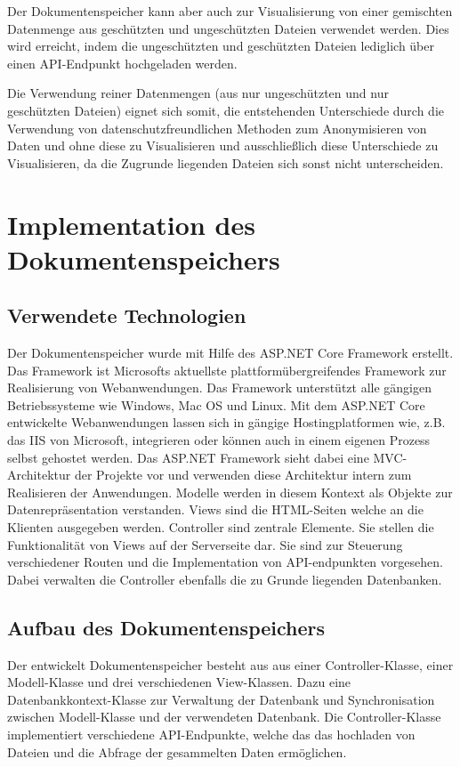 \documentclass[
    fontsize=12pt,
    headings=small,
    parskip=half,           %
    bibliography=totoc,
    numbers=noenddot,       %
    open=any,               %
    ]{scrreprt}
\begin{document}
Der Dokumentenspeicher kann aber auch zur Visualisierung von einer gemischten Datenmenge aus geschützten und ungeschützten Dateien verwendet werden. Dies wird erreicht, indem die ungeschützten und geschützten Dateien lediglich über einen API-Endpunkt hochgeladen werden.

Die Verwendung reiner Datenmengen (aus nur ungeschützten und nur geschützten Dateien) eignet sich somit, die entstehenden Unterschiede durch die Verwendung von datenschutzfreundlichen Methoden zum Anonymisieren von Daten und ohne diese zu Visualisieren und ausschließlich diese Unterschiede zu Visualisieren, da die Zugrunde liegenden Dateien sich sonst nicht unterscheiden. 

\newpage
    \section{Implementation des Dokumentenspeichers}    
    
    \subsection{Verwendete Technologien}
Der Dokumentenspeicher wurde mit Hilfe des ASP.NET Core Framework erstellt. 
Das Framework ist Microsofts aktuellste plattformübergreifendes Framework zur Realisierung von Webanwendungen.
Das Framework unterstützt alle gängigen Betriebssysteme wie Windows, Mac OS und Linux.
Mit dem ASP.NET Core entwickelte Webanwendungen lassen sich in gängige Hostingplatformen wie, z.B. das IIS von Microsoft, integrieren oder können auch in einem eigenen Prozess selbst gehostet werden. 
Das ASP.NET Framework sieht dabei eine MVC-Architektur der Projekte vor und verwenden diese Architektur intern zum Realisieren der Anwendungen. 
Modelle werden in diesem Kontext als Objekte zur Datenrepräsentation verstanden. 
Views sind die HTML-Seiten welche an die Klienten ausgegeben werden.
Controller sind zentrale Elemente. 
Sie stellen die Funktionalität von Views auf der Serverseite dar.
Sie sind zur Steuerung verschiedener Routen und die Implementation von API-endpunkten vorgesehen.
Dabei verwalten die Controller ebenfalls die zu Grunde liegenden Datenbanken.
    \subsection{Aufbau des Dokumentenspeichers}

Der entwickelt Dokumentenspeicher besteht aus aus einer Controller-Klasse, einer Modell-Klasse und drei verschiedenen View-Klassen.
Dazu eine Datenbankkontext-Klasse zur Verwaltung der Datenbank und Synchronisation zwischen Modell-Klasse und der verwendeten Datenbank.
Die Controller-Klasse implementiert verschiedene API-Endpunkte, welche das das hochladen von Dateien und die Abfrage der gesammelten Daten ermöglichen.
\end{document}

